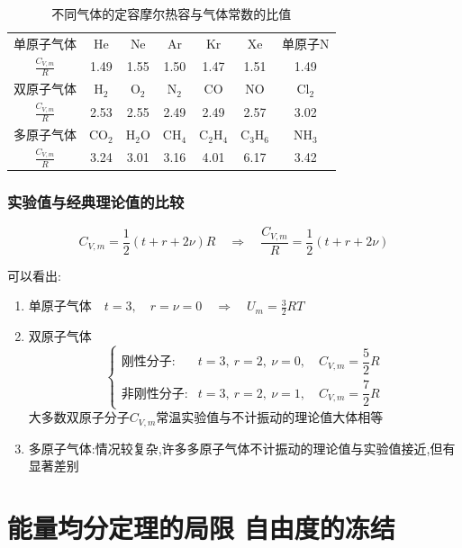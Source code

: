 \documentclass{article}
\begin{document}
\begin{table}[htbp]
  \centering
  \setlength{\tabcolsep}{8pt}
  \renewcommand{\arraystretch}{1.5}
  \begin{tabular}{ccccccc}
    \toprule
    单原子气体 & He & Ne & Ar & Kr & Xe & 单原子N \\
    $\displaystyle \frac{C_{V,m}}{R}$ & 1.49 & 1.55 & 1.50 & 1.47 & 1.51 & 1.49 \\
    \midrule
    双原子气体 & H$_2$ & O$_2$ & N$_2$ & CO & NO & Cl$_2$ \\
    $\displaystyle \frac{C_{V,m}}{R}$ & 2.53 & 2.55 & 2.49 & 2.49 & 2.57 & 3.02 \\
    \midrule
    多原子气体 & CO$_2$ & H$_2$O & CH$_4$ & C$_2$H$_4$ & C$_3$H$_6$ & NH$_3$ \\
    $\displaystyle \frac{C_{V,m}}{R}$ & 3.24 & 3.01 & 3.16 & 4.01 & 6.17 & 3.42 \\
    \bottomrule
  \end{tabular}
  \caption{不同气体的定容摩尔热容与气体常数的比值}
  \label{tab:cv_m_ratio_booktabs}
\end{table}

\newpage

\subsubsection{实验值与经典理论值的比较}

$$C_{V,m}=\frac{1}{2}(t+r+2\nu)R\quad\Rightarrow\quad\frac{C_{V,m}}{R}=\frac{1}{2}(t+r+2\nu)$$
 

可以看出:
\begin{enumerate}
    \item 单原子气体$\quad t=3,\quad r=\nu=0\quad\Rightarrow\quad U_m=\frac{3}{2}RT$
    \item 双原子气体
    $$
    \begin{cases}
    \text{刚性分子:} & t=3,\ r=2,\ \nu=0,\quad C_{V,m}=\dfrac{5}{2}R \\[6pt]
    \text{非刚性分子:} & t=3,\ r=2,\ \nu=1,\quad C_{V,m}=\dfrac{7}{2}R
    \end{cases}
    $$
大多数双原子分子$C_{V,m}$常温实验值与不计振动的理论值大体相等
\item 多原子气体:情况较复杂,许多多原子气体不计振动的理论值与实验值接近,但有显著差别           
\end{enumerate}

\newpage

\section{能量均分定理的局限  自由度的冻结}
\end{document}
